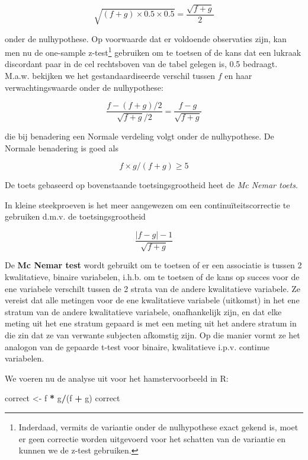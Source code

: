 \documentclass[
  12pt,dutch,coursenotes]{book}
\newenvironment{Shaded}{\begin{snugshade}}{\end{snugshade}}
\newcommand{\NormalTok}[1]{#1}
\newcommand{\OperatorTok}[1]{\textcolor[rgb]{0.81,0.36,0.00}{\textbf{#1}}}
\newcommand{\StringTok}[1]{\textcolor[rgb]{0.31,0.60,0.02}{#1}}
\theoremstyle{definition}
\theoremstyle{definition}
\theoremstyle{definition}
\theoremstyle{remark}
\begin{document}
\begin{equation*}
\sqrt{(f+g)\times 0.5\times 0.5}=\frac{\sqrt{f+g}}{2}
\end{equation*}

onder de nulhypothese. Op voorwaarde dat er voldoende observaties zijn, kan men nu de one-sample z-test\footnote{Inderdaad, vermits de variantie onder de nulhypothese exact gekend is, moet er geen correctie worden uitgevoerd voor het schatten van de variantie en kunnen we de z-test gebruiken.}
gebruiken om te toetsen of de kans dat een lukraak discordant paar in de cel rechtsboven van de tabel
gelegen is, 0.5 bedraagt. M.a.w. bekijken we het gestandaardiseerde verschil
tussen \(f\) en haar verwachtingswaarde onder de nulhypothese:

\begin{equation*}
\frac{f-(f+g)/2}{\sqrt{f+g}/2}=\frac{f-g}{\sqrt{f+g}}
\end{equation*}

die bij benadering een Normale verdeling volgt onder de nulhypothese.
De Normale benadering is goed als

\[f \times g/(f+g) \geq 5\]

De toets gebaseerd op bovenstaande toetsingsgrootheid heet de \emph{Mc Nemar toets}.

In kleine steekproeven is het meer aangewezen om een continuïteitscorrectie te gebruiken d.m.v. de toetsingsgrootheid

\begin{equation*}
\frac{|f-g|-1}{\sqrt{f+g}}
\end{equation*}

De \textbf{Mc Nemar test} wordt gebruikt om te toetsen of er een associatie is tussen 2 kwalitatieve, binaire variabelen, i.h.b. om te toetsen of de kans op succes voor de ene variabele verschilt tussen de 2 strata van de andere kwalitatieve variabele. Ze vereist dat alle metingen voor de ene kwalitatieve variabele (uitkomst) in het ene stratum van de andere kwalitatieve variabele, onafhankelijk zijn, en dat elke meting uit het ene stratum gepaard is met een meting uit het andere stratum in die zin dat ze van verwante subjecten afkomstig zijn. Op die manier vormt ze het analogon van de gepaarde t-test voor binaire, kwalitatieve i.p.v. continue variabelen.

We voeren nu de analyse uit voor het hamstervoorbeeld in R:

\begin{Shaded}
\begin{Highlighting}[]
\NormalTok{correct \textless{}{-}}\StringTok{ }\NormalTok{f }\OperatorTok{*}\StringTok{ }\NormalTok{g}\OperatorTok{/}\NormalTok{(f }\OperatorTok{+}\StringTok{ }\NormalTok{g)}
\NormalTok{correct}
\end{Highlighting}
\end{Shaded}
\end{document}

